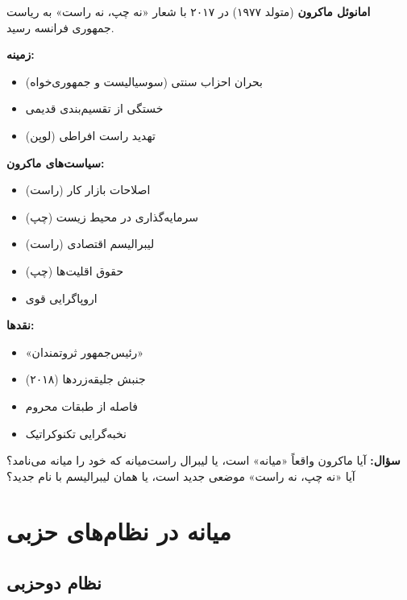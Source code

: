 \begin{tcolorbox}[
    enhanced,
    colback=gray!5,
    colframe=darkgray,
    boxrule=2pt,
    arc=10pt,
    shadow={2mm}{-2mm}{0mm}{black!30},
    fonttitle=\bfseries\large,
    title={\rl{📋 موردکاوی: امانوئل ماکرون و «نه چپ، نه راست»}}
]

\textbf{امانوئل ماکرون} (متولد ۱۹۷۷) در ۲۰۱۷ با شعار «نه چپ، نه راست» به ریاست جمهوری فرانسه رسید.

\textbf{زمینه:}
\begin{itemize}
    \item بحران احزاب سنتی (سوسیالیست و جمهوری‌خواه)
    \item خستگی از تقسیم‌بندی قدیمی
    \item تهدید راست افراطی (لوپن)
\end{itemize}

\textbf{سیاست‌های ماکرون:}
\begin{itemize}
    \item اصلاحات بازار کار (راست)
    \item سرمایه‌گذاری در محیط زیست (چپ)
    \item لیبرالیسم اقتصادی (راست)
    \item حقوق اقلیت‌ها (چپ)
    \item اروپاگرایی قوی
\end{itemize}



\textbf{نقدها:}
\begin{itemize}
    \item «رئیس‌جمهور ثروتمندان»
    \item جنبش جلیقه‌زردها (۲۰۱۸)
    \item فاصله از طبقات محروم
    \item نخبه‌گرایی تکنوکراتیک
\end{itemize}

\textbf{سؤال:}
آیا ماکرون واقعاً «میانه» است، یا لیبرال راست‌میانه که خود را میانه می‌نامد؟ آیا «نه چپ، نه راست» موضعی جدید است، یا همان لیبرالیسم با نام جدید؟

\end{tcolorbox}

\section{میانه در نظام‌های حزبی}

\subsection{نظام دوحزبی}


